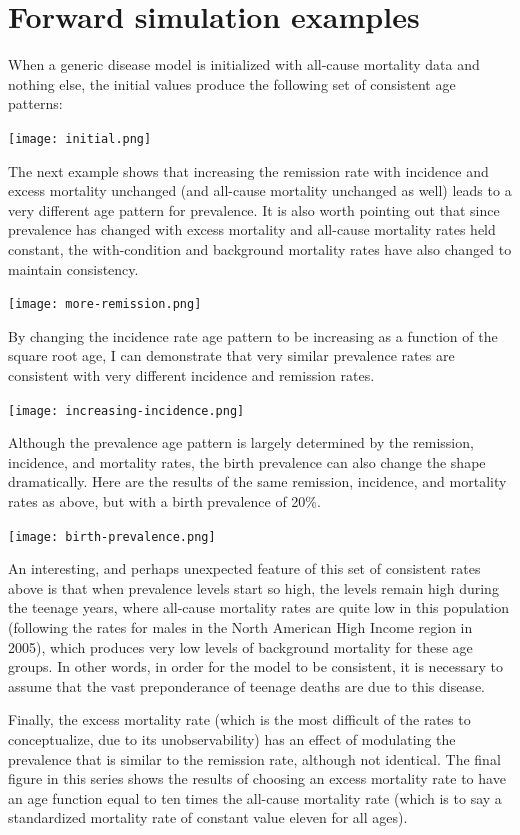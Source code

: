 \section{Forward simulation examples}

When a generic disease model is initialized with all-cause mortality
data and nothing else, the initial values produce the following set of
consistent age patterns:

\texttt{[image: initial.png]}

The next example shows that increasing the remission rate with
incidence and excess mortality unchanged (and all-cause mortality
unchanged as well) leads to a very different age pattern for
prevalence. It is also worth pointing out that since prevalence has
changed with excess mortality and all-cause mortality rates held
constant, the with-condition and background mortality rates have also
changed to maintain consistency.

\texttt{[image: more-remission.png]}

By changing the incidence rate age pattern to be increasing as a
function of the square root age, I can demonstrate that very similar
prevalence rates are consistent with very different incidence and
remission rates.

\texttt{[image: increasing-incidence.png]}

Although the prevalence age pattern is largely determined by the
remission, incidence, and mortality rates, the birth prevalence can
also change the shape dramatically.  Here are the results of the same
remission, incidence, and mortality rates as above, but with a birth
prevalence of 20\%.

\texttt{[image: birth-prevalence.png]}

An interesting, and perhaps unexpected feature of this set of
consistent rates above is that when prevalence levels start so high,
the levels remain high during the teenage years, where all-cause
mortality rates are quite low in this population (following the rates
for males in the North American High Income region in 2005), which
produces very low levels of background mortality for these age
groups. In other words, in order for the model to be consistent, it is
necessary to assume that the vast preponderance of teenage deaths are
due to this disease.

Finally, the excess mortality rate (which is the most difficult of the
rates to conceptualize, due to its unobservability) has an effect of
modulating the prevalence that is similar to the remission rate,
although not identical.  The final figure in this series shows the
results of choosing an excess mortality rate to have an age function
equal to ten times the all-cause mortality rate (which is to say a
standardized mortality rate of constant value eleven for all ages).


